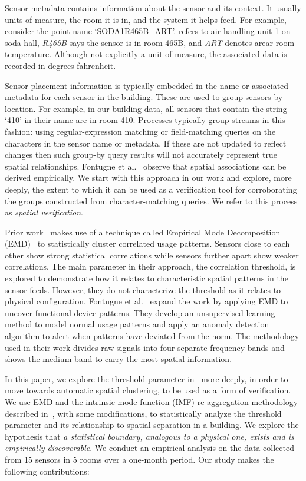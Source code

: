 Sensor metadata contains information about the sensor and its context.  It usually units of measure, 
the room it is in, and the system it helps feed.  For example, consider the point name `SODA1R465B_ART'.
 refers to air-handling unit 1 on soda hall, \emph{R465B} says the sensor is in room 465B, and \emph{ART}
denotes arear-room temperature.  Although not explicitly a unit of measure, the associated data is recorded in degrees
fahrenheit.

Sensor placement information is typically embedded in the name or associated metadata for each sensor in the building.
These are used to group sensors by location.  For example, in our building data, all sensors that contain the string
 `410' in their name are in room 410.  Processes typically group streams in this fashion: using regular-expression matching 
or field-matching queries on the characters in the sensor name or metadata.  If these are not updated to reflect changes
then such group-by query results will not accurately represent true spatial relationships.  
Fontugne et al.~\cite{IOT} observe that spatial associations can be derived empirically.  We start with this approach in our 
work and explore, more deeply, the extent to which it can be used 
as a verification tool for corroborating the groups constructed from character-matching queries.  We refer
to this process as \emph{spatial verification}.

Prior work~\cite{IOT} makes use of a technique called Empirical Mode Decomposition (EMD)~\cite{EMD} to statistically cluster correlated
usage patterns.  Sensors close to each other show strong statistical correlations while sensors further apart show weaker correlations.  
The main parameter in their approach, the correlation threshold, is explored to demonstrate how it relates to characteristic spatial patterns
 in the sensor feeds.  However, they do not characterize the threshold as it relates to physical configuration.
Fontugne et al.~\cite{SBS} expand the work by applying EMD to uncover functional device patterns.  They develop
an unsupervised learning method to model normal usage patterns and apply an anomaly detection algorithm to alert when patterns
have deviated from the norm.  The methodology used in their work divides raw signals into four separate frequency bands
and shows the medium band to carry the most spatial information.

In this paper, we explore the threshold parameter in~\cite{IOT} more deeply, in order to move towards automatic spatial clustering, 
to be used as a form of verification. We use EMD and the intrinsic mode function (IMF) re-aggregation methodology described in~\cite{SBS}, with some modifications, to statistically analyze the threshold parameter
and its relationship to spatial separation in a building.  We explore the hypothesis that \emph{a statistical boundary, analogous to a physical one,
exists and is empirically discoverable}.
We conduct an empirical analysis on the data collected from 15 sensors in 5 rooms over a one-month period.  Our study makes the following contributions:

